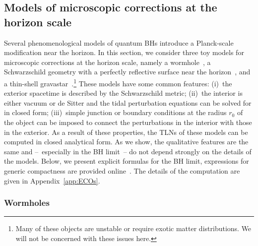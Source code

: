 \documentclass[aps,twocolumn,showpacs,preprintnumbers,nofootinbib,prd,superscriptaddress,groupedaddress,10pt]{revtex4-1}
\begin{document}
\subsection{Models of microscopic corrections at the horizon scale} \label{sec:QC}
Several phenomenological models of quantum BHs introduce a Planck-scale modification near the horizon. In this section, we consider three toy models for microscopic corrections at the horizon scale, namely a wormhole~\cite{visser1995lorentzian}, a Schwarzschild geometry with a perfectly reflective surface near the horizon~\cite{Saravani:2012is,Abedi:2016hgu}, and a thin-shell gravastar~\cite{Mazur:2001fv}.\footnote{Many of these objects are unstable or require exotic matter distributions. We will not be concerned with these issues here.} These models have some common features: (i)~the exterior spacetime is described by the Schwarzschild metric; (ii)~the interior is either vacuum or de Sitter and the tidal perturbation equations can be solved for in closed form; (iii)~simple junction or boundary conditions at the radius $r_0$ of the object can be imposed to connect the perturbations in the interior with those in the exterior. As a result of these properties, the TLNs of these models can be computed in closed analytical form. As we show, the qualitative features are the same and --~especially in the BH limit~-- do not depend strongly on the details of the models. Below, we present explicit formulas for the BH limit, expressions for generic compactness are provided online~\cite{webpage}. The details of the computation are given in Appendix~\ref{app:ECOs}.

\subsubsection{Wormholes}\label{sec:WHs}
\end{document}

